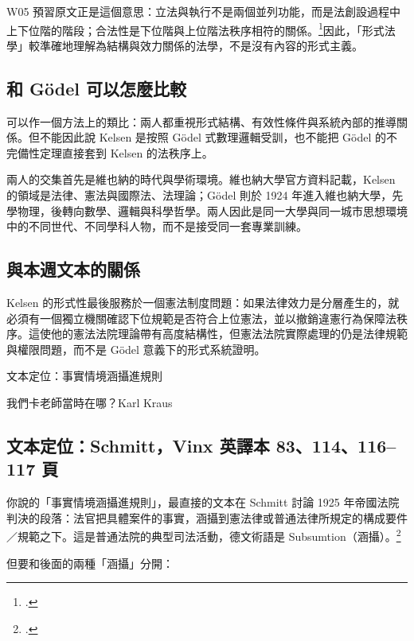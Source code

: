 W05 預習原文正是這個意思：立法與執行不是兩個並列功能，而是法創設過程中上下位階的階段；合法性是下位階與上位階法秩序相符的關係。\footcites[23--24]{kelsen2015}[31--32]{kelsen1929}因此，「形式法學」較準確地理解為結構與效力關係的法學，不是沒有內容的形式主義。

\subsection{和 Gödel 可以怎麼比較}

可以作一個方法上的類比：兩人都重視形式結構、有效性條件與系統內部的推導關係。但不能因此說 Kelsen 是按照 Gödel 式數理邏輯受訓，也不能把 Gödel 的不完備性定理直接套到 Kelsen 的法秩序上。

兩人的交集首先是維也納的時代與學術環境。維也納大學官方資料記載，Kelsen 的領域是法律、憲法與國際法、法理論；Gödel 則於 1924 年進入維也納大學，先學物理，後轉向數學、邏輯與科學哲學。兩人因此是同一大學與同一城市思想環境中的不同世代、不同學科人物，而不是接受同一套專業訓練。

\subsection{與本週文本的關係}

Kelsen 的形式性最後服務於一個憲法制度問題：如果法律效力是分層產生的，就必須有一個獨立機關確認下位規範是否符合上位憲法，並以撤銷違憲行為保障法秩序。這使他的憲法法院理論帶有高度結構性，但憲法法院實際處理的仍是法律規範與權限問題，而不是 Gödel 意義下的形式系統證明。


\begin{qaprompt}
文本定位：事實情境涵攝進規則

我們卡老師當時在哪？Karl Kraus
\end{qaprompt}

\subsection{文本定位：Schmitt，Vinx 英譯本 83、114、116--117 頁}

你說的「事實情境涵攝進規則」，最直接的文本在 Schmitt 討論 1925 年帝國法院判決的段落：法官把具體案件的事實，涵攝到憲法律或普通法律所規定的構成要件／規範之下。這是普通法院的典型司法活動，德文術語是 Subsumtion（涵攝）。\footcites[15]{schmitt1931}[83]{schmitt2015}

但要和後面的兩種「涵攝」分開：

